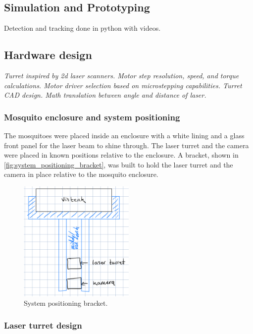 \subsection{Simulation and Prototyping}
Detection and tracking done in python with videos.


\subsection{Hardware design}
\textit{Turret inspired by 2d laser scanners. Motor step resolution, speed, and torque calculations. Motor driver selection based on microstepping capabilities. Turret CAD design. Math translation between angle and distance of laser.}

\subsubsection{Mosquito enclosure and system positioning}

The mosquitoes were placed inside an enclosure with a white lining and a glass front panel for the laser beam to shine through. The laser turret and the camera were placed in known positions relative to the enclosure. A bracket, shown in \autoref{fig:system_positioning_bracket}, was built to hold the laser turret and the camera in place relative to the mosquito enclosure.

\begin{figure}[h]
    \centering
    \includegraphics[width=0.5\textwidth]{figures/positioning_bracket.png}
    \caption{System positioning bracket.}
    \label{fig:system_positioning_bracket}
\end{figure}

\subsubsection{Laser turret design}

